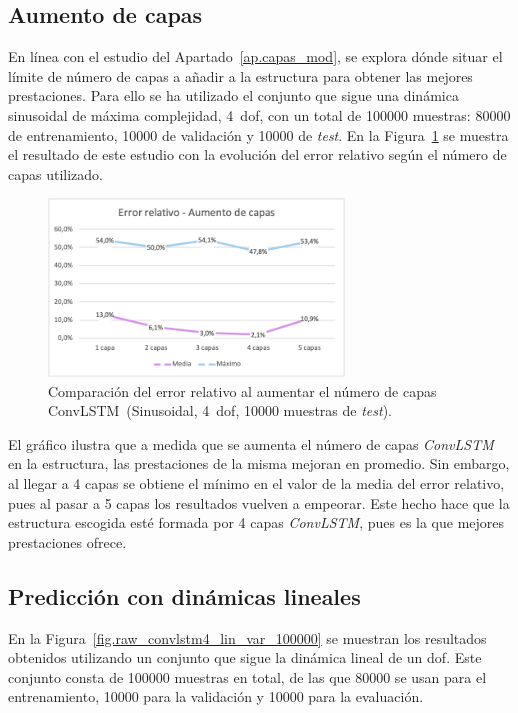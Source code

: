 \subsection{Aumento de capas}
En línea con el estudio del Apartado~\ref{ap.capas_mod}, se explora dónde situar el límite de número de capas a añadir a la estructura para obtener las mejores prestaciones. Para ello se ha utilizado el conjunto que sigue una dinámica sinusoidal de máxima complejidad, 4~\acrshort{dof}, con un total de 100000 muestras: 80000 de entrenamiento, 10000 de validación y 10000 de \textit{test}. En la Figura~\ref{fig.capas_raw} se muestra el resultado de este estudio con la evolución del error relativo según el número de capas utilizado.
\begin{figure}[H]
		\begin{center}
			\includegraphics[width=0.7\textwidth]{ figures/test_raw/REC/ConvLSTM_complex/capas_raw.png}
			\caption{Comparación del error relativo al aumentar el número de capas ConvLSTM~(Sinusoidal, 4~\acrshort{dof}, 10000 muestras de \textit{test}).}
			\label{fig.capas_raw}
		\end{center}
\end{figure}
\vspace{-10pt}

El gráfico ilustra que a medida que se aumenta el número de capas \textit{ConvLSTM} en la estructura, las prestaciones de la misma mejoran en promedio. Sin embargo, al llegar a 4 capas se obtiene el mínimo en el valor de la media del error relativo, pues al pasar a 5 capas los resultados vuelven a empeorar. Este hecho hace que la estructura escogida esté formada por 4 capas \textit{ConvLSTM}, pues es la que mejores prestaciones ofrece.

\subsection{Predicción con dinámicas lineales}
En la Figura~\ref{fig.raw_convlstm4_lin_var_100000} se muestran los resultados obtenidos utilizando un conjunto que sigue la dinámica lineal de un \acrshort{dof}. Este conjunto consta de 100000 muestras en total, de las que 80000 se usan para el entrenamiento, 10000 para la validación y 10000 para la evaluación.


